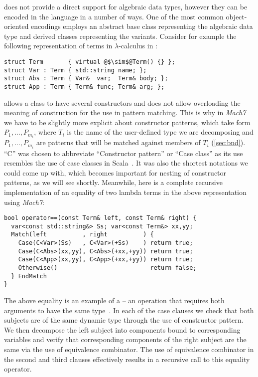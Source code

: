 \Cpp{} does not provide a direct support for algebraic data types, however they 
can be encoded in the language in a number of ways. One of the most common 
object-oriented encodings employs an abstract base class representing the 
algebraic data type and derived classes representing the variants. Consider for 
example the following representation of terms in $\lambda$-calculus in \Cpp{}:

\begin{lstlisting}[columns=flexible]
struct Term       { virtual @$\sim$@Term() {} };
struct Var : Term { std::string name; };
struct Abs : Term { Var&  var;  Term& body; };
struct App : Term { Term& func; Term& arg; };
\end{lstlisting}

\noindent
\Cpp{} allows a class to have several constructors and does not allow 
overloading the meaning of construction for the use in pattern matching. This is
why in \emph{Mach7} we have to be slightly more explicit about constructor patterns, 
which take form $P_1,...,P_{m_i}$\code{)}, where $T_i$ is the name of 
the user-defined type we are decomposing and $P_1,...,P_{m_i}$ are patterns that 
will be matched against members of $T_i$ (\textsection\ref{sec:bnd}). ``C'' was
chosen to abbreviate ``Constructor pattern'' or ``Case class'' as its use 
resembles the use of case classes in Scala~\cite{Scala2nd}. It was also the 
shortest notations we could come up with, which becomes important for nesting of 
constructor patterns, as we will see shortly. Meanwhile, here is a complete 
recursive implementation of an equality of two lambda terms in the above 
representation using \emph{Mach7}:

\begin{lstlisting}[columns=flexible]
bool operator==(const Term& left, const Term& right) {
  var<const std::string&> Ss; var<const Term&> xx,yy;
  Match(left          , right          ) {
    Case(C<Var>(Ss)   , C<Var>(+Ss)    ) return true;
    Case(C<Abs>(xx,yy), C<Abs>(+xx,+yy)) return true;
    Case(C<App>(xx,yy), C<App>(+xx,+yy)) return true;
    Otherwise()                          return false;
  } EndMatch
}
\end{lstlisting}

\noindent
The above equality is an example of a  -- an operation that 
requires both arguments to have the same type~\cite{BCCLP95}. In each of the 
case clauses we check that both subjects are of the same dynamic type through 
the use of constructor pattern. We then decompose the left subject into 
components bound to corresponding variables and verify that corresponding 
components of the right subject are the same via the use of equivalence 
combinator. The use of equivalence combinator in the second and third clauses 
effectively results in a recursive call to this equality operator.

